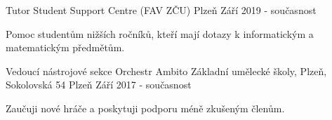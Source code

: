 

\begin{cventries}

  \cventry
    {Tutor} %
    {Student Support Centre (FAV ZČU)} %
    {Plzeň} %
    {Září 2019 - současnost} %
    {
      \begin{cvitems} %
        \item {Pomoc studentům nižších ročníků, kteří mají dotazy k informatickým a matematickým předmětům.}
      \end{cvitems}
    }

  \cventry
    {Vedoucí nástrojové sekce} %
    {Orchestr Ambito Základní umělecké školy, Plzeň, Sokolovská 54} %
    {Plzeň} %
    {Září 2017 - současnost} %
    {
      \begin{cvitems} %
        \item {Zaučuji nové hráče a poskytuji podporu méně zkušeným členům.}
      \end{cvitems}
    }




\end{cventries}
